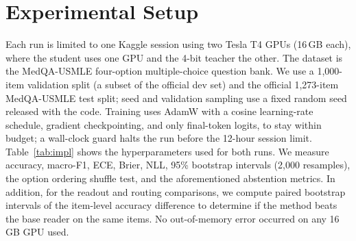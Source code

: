\documentclass[conference]{IEEEtran}
\begin{document}
\section{Experimental Setup}
Each run is limited to one Kaggle session using two Tesla T4 GPUs (16\,GB each), where the student uses one GPU and the 4-bit teacher the other. The dataset is the MedQA-USMLE four-option multiple-choice question bank. We use a 1{,}000-item validation split (a subset of the official dev set) and the official 1{,}273-item MedQA-USMLE test split; seed and validation sampling use a fixed random seed released with the code. Training uses AdamW with a cosine learning-rate schedule, gradient checkpointing, and only final-token logits, to stay within budget; a wall-clock guard halts the run before the 12-hour session limit. Table~\ref{tab:impl} shows the hyperparameters used for both runs. We measure accuracy, macro-F1, ECE, Brier, NLL, 95\% bootstrap intervals (2{,}000 resamples), the option ordering shuffle test, and the aforementioned abstention metrics. In addition, for the readout and routing comparisons, we compute paired bootstrap intervals of the item-level accuracy difference to determine if the method beats the base reader on the same items. No out-of-memory error occurred on any 16\,GB GPU used.
\end{document}
